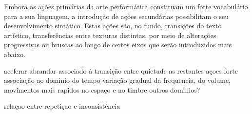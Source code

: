 \documentclass[../main.tex]{subfiles}
\begin{document}

Embora as ações primárias da arte performática constituam um forte vocabulário para a sua linguagem, a introdução de ações secundárias possibilitam o seu desenvolvimento sintático. Estas ações são, no fundo, transições do texto artístico, transferências entre texturas distintas, por meio de alterações progressivas ou bruscas ao longo de certos eixos que serão introduzidos mais abaixo.


acelerar abrandar
associado à transição entre quietude as restantes açoes
forte associação ao dominio do tempo
variação gradual da frequencia, do volume, movimentos mais rapidos no espaço e no timbre
outros dominios?


relaçao entre repetiçao e inconsistência





\end{document}

